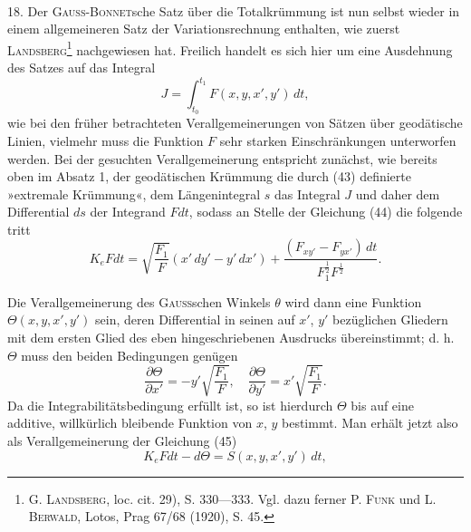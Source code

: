 \clearpage\begingroup\NoSourceHead{}
\renewcommand{\thefootnote}{\arabic{footnote})}\setcounter{footnote}{35}
\begin{center}\\
\end{center}
\noindent\hspace*{\parindent}18. Der \textsc{Gauss-Bonnet}sche Satz über die Totalkrümmung ist nun selbst
wieder in einem allgemeineren Satz der Variationsrechnung enthalten, wie
\clearpage{}
\noindent zuerst \textsc{Landsberg}\footnote{G. \textsc{Landsberg}, loc. cit. 29), S. 330—333. Vgl. dazu ferner P. \textsc{Funk} und L. \textsc{Berwald}, Lotos, Prag
67/68 (1920), S. 45.} nachgewiesen hat. Freilich handelt es sich hier 
um eine Ausdehnung des Satzes auf das  Integral
\[
J=\int_{t_0}^{t_1}F(x,y,x',y')\,dt,
\]
wie bei den früher betrachteten Verallgemeinerungen von Sätzen über geodätische Linien, vielmehr muss die Funktion $F$ sehr starken Einschränkungen
unterworfen werden. Bei der gesuchten Verallgemeinerung entspricht zunächst,
wie bereits oben im Absatz 1, der geodätischen Krümmung die durch (43)
definierte »extremale Krümmung«, dem Längenintegral $s$ das Integral $J$ und
daher dem Differential $ds$ der Integrand $Fdt$, sodass an Stelle der Gleichung
(44) die folgende tritt
\[
K_eFdt=\sqrt{\frac{F_1}{F}}(x'\,dy'-y'\,dx')+\frac{(F_{xy'}-F_{yx'})\,dt}{F_1^{\frac12}F^{\frac12}}.
\]
\par\noindent\hspace*{\parindent}Die Verallgemeinerung des \textsc{Gauss}schen Winkels $\theta$ wird dann eine Funktion
$\Theta(x,y,x',y')$ sein, deren Differential in seinen auf $x'$, $y'$ bezüglichen Gliedern
mit dem ersten Glied des eben hingeschriebenen Ausdrucks übereinstimmt;
d. h. $\Theta$ muss den beiden Bedingungen genügen
\[
\frac{\partial\Theta}{\partial x'}=-y'\sqrt{\frac{F_1}{F}},\quad
\frac{\partial\Theta}{\partial y'}=x'\sqrt{\frac{F_1}{F}}.
\]
Da die Integrabilitätsbedingung erfüllt ist, so ist hierdurch $\Theta$ bis auf eine
additive, willkürlich bleibende Funktion von $x$, $y$ bestimmt. Man erhält jetzt
also als Verallgemeinerung der Gleichung (45)
\begin{equation*}\tag{48}
K_eFdt-d\Theta=S(x,y,x',y')\,dt,
\end{equation*}

